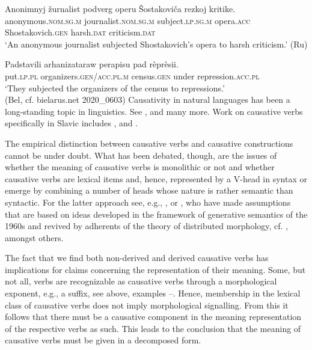 \documentclass[output=paper]{langscibook}
\begin{document}
  \ex \gll   Anonimnyj žurnalist podverg operu Šostakoviča   rezkoj kritike.\\
    anonymous.\textsc{nom.sg.m} journalist.\textsc{nom.sg.m} subject.\textsc{lp.sg.m} opera.\textsc{acc} Shostakovich.\textsc{gen} harsh.\textsc{dat} criticism.\textsc{dat}\\
    \glt ‘An anonymous journalist subjected Shostakovich’s opera to harsh criticism.’ \hfill (Ru)

  \ex \gll   Padstavili arhanizataraw perapisu pad rèprèsii.\\
    put.\textsc{lp.pl} organizers.\textsc{gen/acc.pl.m} census.\textsc{gen} under repression.\textsc{acc.pl}\\
    \glt ‘They subjected the organizers of the census to repressions.’ \\ \hfill(Bel, cf. bielarus.net 2020\_0603) \label{ex:junghanns:6h}
\z
\z
\largerpage[2]
\noindent Causativity in natural languages has been a long-standing topic in linguistics. See \citet{McCawley1968uwe,NedjalkovSilnickij1969a,NedjalkovSilnickij1969b,Fodor1970,Wierzbicka1975,Comrie1976,Farber1976,Shibatani1976ed,Shibatani1976,Shibatani2002ed,Talmy1976,Wali1981,KemmerVerhagen1994,LevinRappaportHovav1994,Wunderlich1997cause,Dixon2000,Kulikov2001,Bierwisch2002,Bierwisch2005,Wolffetal2002,Song2011b,Song2011a,NeelemanVandeKoot2012}, and many more. Work on causative verbs specifically in Slavic includes \citet{Batistic1978,Paduceva2001,Karlik2002,Bilandzija2014}, and \citet{Bondaruk2021}.

The empirical distinction between causative verbs and causative constructions cannot be under doubt. What has been debated, though, are the issues of whether the meaning of causative verbs is monolithic or not and whether causative verbs are lexical items and, hence, represented by a V-head in syntax or emerge by combining a number of heads whose nature is rather semantic than syntactic. For the latter approach see, e.g., \citet{McCawley1971,vonStechow1996,Alexiadouetal2006,Ramchand2008,Schaefer2008,Alexiadou2010}, or \citet{Bondaruk2021}, who have made assumptions that are based on ideas developed in the framework of generative semantics of the 1960s and revived by adherents of the theory of distributed morphology, cf. \citet{HalleMarantz1993}, amongst others.

The fact that we find both non-derived and derived causative verbs has implications for claims concerning the representation of their meaning. Some, but not all, verbs are recognizable as causative verbs through a morphological exponent, e.g., a suffix, see above, examples --. Hence, membership in the lexical class of causative verbs does not imply morphological signalling. From this it follows that  there must be a causative component in the meaning representation of the respective verbs as such. This leads to the conclusion that the meaning of causative verbs must be given in a decomposed form.
\end{document}
